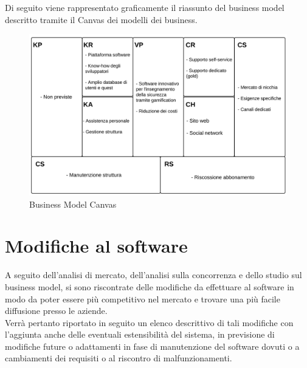 Di seguito viene rappresentato graficamente il riassunto del business model descritto tramite il Canvas dei modelli dei business.

\begin{figure}[H]
\centering
\includegraphics[scale=0.8]{images/cap5/BM.png}
\caption{Business Model Canvas}
\end{figure}


\section{Modifiche al software}
A seguito dell'analisi di mercato, dell'analisi sulla concorrenza e dello studio sul business model, si sono riscontrate delle modifiche da effettuare al software in modo da poter essere più competitivo nel mercato e trovare una più facile diffusione presso le aziende.\\
Verrà pertanto riportato in seguito un elenco descrittivo di tali modifiche con l'aggiunta anche delle eventuali estensibilità del sistema, in previsione di modifiche future o adattamenti in fase di manutenzione del software dovuti o a cambiamenti dei requisiti o al riscontro di malfunzionamenti.

